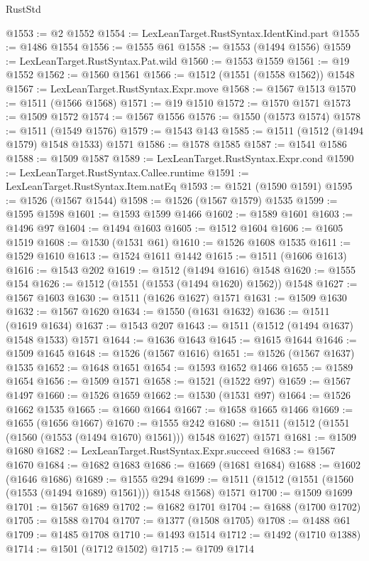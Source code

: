 \begin{lexlean}{RustStd}
\begin{coremodule}
{{@1553 := @2 @1552
@1554 := LexLeanTarget.RustSyntax.IdentKind.part
@1555 := @1486 @1554
@1556 := @1555 @61
@1558 := @1553 (@1494 @1556)
@1559 := LexLeanTarget.RustSyntax.Pat.wild
@1560 := @1553 @1559
@1561 := @19 @1552
@1562 := @1560 @1561
@1566 := @1512 (@1551 (@1558 @1562)) @1548
@1567 := LexLeanTarget.RustSyntax.Expr.move
@1568 := @1567 @1513
@1570 := @1511 (@1566 @1568)
@1571 := @19 @1510
@1572 := @1570 @1571
@1573 := @1509 @1572
@1574 := @1567 @1556
@1576 := @1550 (@1573 @1574)
@1578 := @1511 (@1549 @1576)
@1579 := @1543 @143
@1585 := @1511 (@1512 (@1494 @1579) @1548 @1533) @1571
@1586 := @1578 @1585
@1587 := @1541 @1586
@1588 := @1509 @1587
@1589 := LexLeanTarget.RustSyntax.Expr.cond
@1590 := LexLeanTarget.RustSyntax.Callee.runtime
@1591 := LexLeanTarget.RustSyntax.Item.natEq
@1593 := @1521 (@1590 @1591)
@1595 := @1526 (@1567 @1544)
@1598 := @1526 (@1567 @1579) @1535
@1599 := @1595 @1598
@1601 := @1593 @1599 @1466
@1602 := @1589 @1601
@1603 := @1496 @97
@1604 := @1494 @1603
@1605 := @1512 @1604
@1606 := @1605 @1519
@1608 := @1530 (@1531 @61)
@1610 := @1526 @1608 @1535
@1611 := @1529 @1610
@1613 := @1524 @1611 @1442
@1615 := @1511 (@1606 @1613)
@1616 := @1543 @202
@1619 := @1512 (@1494 @1616) @1548
@1620 := @1555 @154
@1626 := @1512 (@1551 (@1553 (@1494 @1620) @1562)) @1548
@1627 := @1567 @1603
@1630 := @1511 (@1626 @1627) @1571
@1631 := @1509 @1630
@1632 := @1567 @1620
@1634 := @1550 (@1631 @1632)
@1636 := @1511 (@1619 @1634)
@1637 := @1543 @207
@1643 := @1511 (@1512 (@1494 @1637) @1548 @1533) @1571
@1644 := @1636 @1643
@1645 := @1615 @1644
@1646 := @1509 @1645
@1648 := @1526 (@1567 @1616)
@1651 := @1526 (@1567 @1637) @1535
@1652 := @1648 @1651
@1654 := @1593 @1652 @1466
@1655 := @1589 @1654
@1656 := @1509 @1571
@1658 := @1521 (@1522 @97)
@1659 := @1567 @1497
@1660 := @1526 @1659
@1662 := @1530 (@1531 @97)
@1664 := @1526 @1662 @1535
@1665 := @1660 @1664
@1667 := @1658 @1665 @1466
@1669 := @1655 (@1656 @1667)
@1670 := @1555 @242
@1680 := @1511 (@1512 (@1551 (@1560 (@1553 (@1494 @1670) @1561))) @1548 @1627) @1571
@1681 := @1509 @1680
@1682 := LexLeanTarget.RustSyntax.Expr.succeed
@1683 := @1567 @1670
@1684 := @1682 @1683
@1686 := @1669 (@1681 @1684)
@1688 := @1602 (@1646 @1686)
@1689 := @1555 @294
@1699 := @1511 (@1512 (@1551 (@1560 (@1553 (@1494 @1689) @1561))) @1548 @1568) @1571
@1700 := @1509 @1699
@1701 := @1567 @1689
@1702 := @1682 @1701
@1704 := @1688 (@1700 @1702)
@1705 := @1588 @1704
@1707 := @1377 (@1508 @1705)
@1708 := @1488 @61
@1709 := @1485 @1708
@1710 := @1493 @1514
@1712 := @1492 (@1710 @1388)
@1714 := @1501 (@1712 @1502)
@1715 := @1709 @1714
}}
\end{coremodule}
\end{lexlean}
